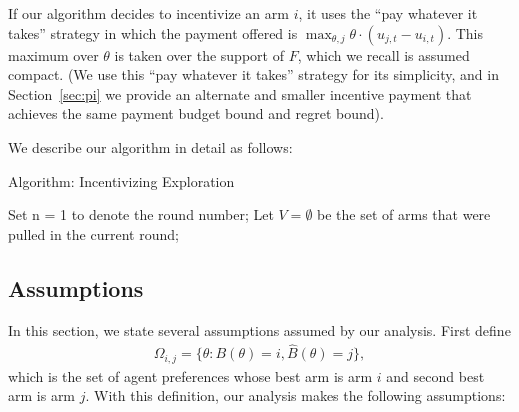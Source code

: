 \documentclass{article}
\begin{document}
If our algorithm decides to incentivize an arm $i$, it uses the ``pay whatever it takes'' strategy in which the payment offered is $\max_{\theta,j} \theta \cdot (u_{j,t} - u_{i,t})$. This maximum over $\theta$ is taken over the support of $F$, which we recall is assumed compact.  (We use this ``pay whatever it takes'' strategy for its simplicity, and in Section~\ref{sec:pi} we provide an alternate and smaller incentive payment that achieves the same payment budget bound and regret bound). 

We describe our algorithm in detail as follows:

\begin{algorithm}
\caption{Algorithm: Incentivizing Exploration}
\label{Alg1}
\begin{algorithmic}
\STATE Set n = 1 to denote the round number; Let $V=\emptyset$ be the set of arms that were pulled in the current round;
\ENDFOR

\end{algorithmic}
\end{algorithm}


\subsection{Assumptions}
In this section, we state several assumptions assumed by our analysis.  First define
\begin{align}
\Omega_{i,j}=\{\theta:B(\theta)=i, \hat{B}(\theta)=j\}, \nonumber 
\end{align}
which is the set of agent preferences whose best arm is arm $i$ and second best arm is arm $j$. With this definition, our analysis makes the following assumptions:
\end{document}
